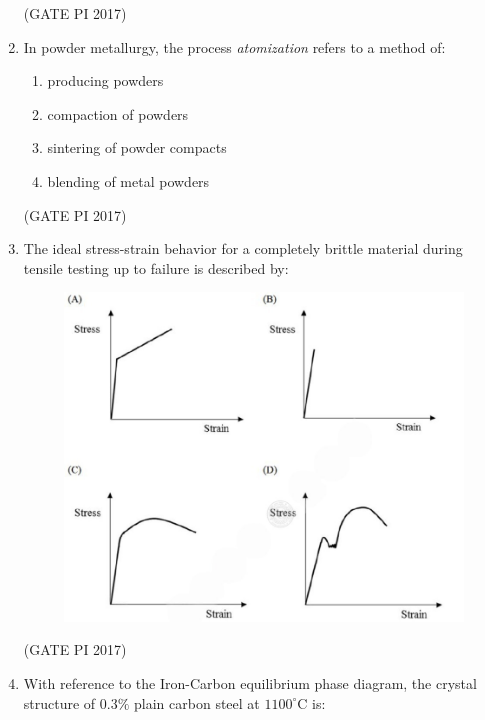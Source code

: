 \documentclass[journal,12pt,onecolumn]{IEEEtran}
\theoremstyle{remark}
\begin{document}
\begin{enumerate}
\hfill (GATE PI 2017)

\item In powder metallurgy, the process \textit{atomization} refers to a method of:
\begin{enumerate}
\item producing powders
\item compaction of powders
\item sintering of powder compacts
\item blending of metal powders
\end{enumerate}

\hfill (GATE PI 2017)

\item The ideal stress\--strain behavior for a completely brittle material during tensile testing up to failure is described by:
\begin{figure}[h]
    \centering
    \includegraphics[width=1\linewidth]{fig2.png}
    \caption{}
    \label{fig:placeholder}
\end{figure}

\hfill (GATE PI 2017)

\item With reference to the Iron\--Carbon equilibrium phase diagram, the crystal structure of $0.3\%$ plain carbon steel at $1100^\circ$C is:
\begin{enumerate}
\end{enumerate}


\end{enumerate}
\end{document}
